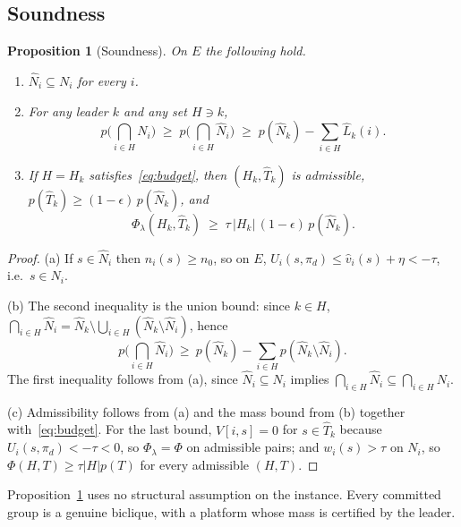 \documentclass[11pt]{article}
\theoremstyle{plain}
\newtheorem{proposition}[theorem]{Proposition}
\theoremstyle{definition}
\theoremstyle{remark}
\begin{document}
\subsection{Soundness}
\begin{proposition}[Soundness]\label{prop:sound}
On $E$ the following hold.
\begin{enumerate}[label=(\alph*)]
    \item $\hat N_i \subseteq N_i$ for every $i$.
    \item For any leader $k$ and any set $H \ni k$,
    \[ p\Big(\bigcap_{i \in H}N_i\Big) \;\ge\; p\Big(\bigcap_{i \in H}\hat{N}_i\Big) \;\ge\; p(\hat{N}_k) - \sum_{i \in H}\hat{L}_k(i). \]
    \item If $H=H_k$ satisfies~\eqref{eq:budget}, then $(H_k, \hat{T}_k)$ is admissible, $p(\hat{T}_k) \ge (1 - \epsilon)\,p(\hat{N}_k)$, and
    \[ \Phi_\lambda(H_k, \hat{T}_k) \;\ge\; \tau\,|H_k|\,(1 - \epsilon)\,p(\hat{N}_k). \]
\end{enumerate}
\end{proposition}
\begin{proof}
(a) If $s\in\hat N_i$ then $n_i(s)\ge n_0$, so on $E$, $U_i(s,\pi_d)\le\hat v_i(s)+\eta<-\tau$, i.e.\ $s\in N_i$.
 
(b) The second inequality is the union bound: since $k\in H$,
$\bigcap_{i \in H}\hat{N}_i=\hat{N}_k\setminus\bigcup_{i \in H}(\hat{N}_k\setminus\hat{N}_i)$, hence
\[ p\Big(\bigcap_{i\in H}\hat N_i\Big)\ \ge\ p(\hat N_k)-\sum_{i\in H}p(\hat N_k\setminus\hat N_i). \]
The first inequality follows from (a), since $\hat N_i\subseteq N_i$ implies $\bigcap_{i\in H}\hat N_i\subseteq\bigcap_{i\in H}N_i$.
 
(c) Admissibility follows from (a) and the mass bound from (b) together with~\eqref{eq:budget}. For the last bound, $V[i,s]=0$ for $s\in\hat T_k$ because $U_i(s,\pi_d)<-\tau<0$,
so $\Phi_\lambda=\Phi$ on admissible pairs; and $w_i(s)>\tau$ on $N_i$, so $\Phi(H,T)\ge\tau|H|p(T)$ for every admissible $(H,T)$.
\end{proof}
 
Proposition~\ref{prop:sound} uses no structural assumption on the instance. Every committed group is a genuine biclique, with a platform whose mass is certified by the leader.
 
\end{document}
